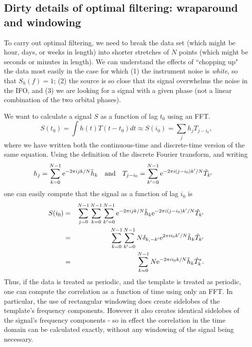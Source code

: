 \subsection{Dirty details of optimal filtering: wraparound and windowing}
\label{ss:dirty}
To carry out optimal filtering, we need to break the data set (which
might be hour, days, or weeks in length) into shorter stretches of $N$
points (which might be seconds or minutes in length). We can understand
the effects of ``chopping up" the data most easily in the case for
which (1) the instrument noise is {\it white}, so that $S_h(f)=1$; (2)
the source is so close that its signal overwhelms the noise in the
IFO, and (3) we are looking for a signal with a given phase (not a
linear combination of the two orbital phases).

We want to calculate a signal $S$ as a function of lag $t_0$ using
an FFT.
\begin{equation}
S(t_0) = \int h(t) T(t-t_0) dt \approx
S(i_0) = \sum_j h_j T_{j-i_0},
\end{equation}
where we have written both the continuous-time and discrete-time version
of the same equation.  Using the definition of the discrete Fourier
transform, and writing
\begin{equation}
h_j = \sum_{k=0}^{N-1} {\rm e}^{-2 \pi i j k/N} \tilde h_k \quad
{\rm and } \quad
T_{j-i_0} = \sum_{k'=0}^{N-1} {\rm e}^{-2 \pi i (j-i_0) k'/N} \tilde T_{k'} \quad
\end{equation}
one can easily compute that the signal as a function of lag $i_0$
is
\begin{eqnarray}
S(i_0) &=& \sum_{j=0}^{N-1} \sum_{k=0}^{N-1} \sum_{k'=0}^{N-1}
{\rm e}^{-2 \pi i j k/N} \tilde h_k 
{\rm e}^{-2 \pi i (j-i_0) k'/N} \tilde T_{k'} \\ 
&=& \sum_{k=0}^{N-1} \sum_{k'=0}^{N-1} N \delta_{k,-k'} 
{\rm e}^{2 \pi i i_0 k'/N} \tilde h_k \tilde T_{k'} \\
&=& \sum_{k=0}^{N-1}   N   
{\rm e}^{-2 \pi i i_0 k/N} \tilde h_k \tilde T^*_{k}.
\end{eqnarray}
Thus, if the data is treated as periodic, and the template is treated as
periodic, one can compute the correlation as a function of time using only
an FFT.  In particular, the use of rectangular windowing does create
sidelobes of the template's frequency components.  However it also creates
identical sidelobes of the signal's frequency components - so in effect the
correlation in the time domain can be calculated exactly, without any windowing
of the signal being necessary.

